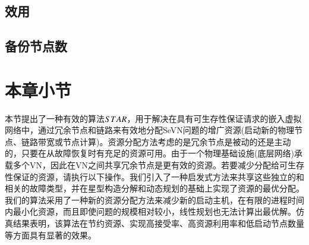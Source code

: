 \subsection{效用}
\subsection{备份节点数}
\section{本章小节}
本节提出了一种有效的算法$STAR$，用于解决在具有可生存性保证请求的嵌入虚拟网络中，通过冗余节点和链路来有效地分配SeVN问题的增广资源(启动新的物理节点、链路带宽或节点计算)。资源分配方法考虑的是冗余节点是被动的还是主动的，只要在从故障恢复时有充足的资源可用。由于一个物理基础设施(底层网络)承载多个VN，因此在VN之间共享冗余节点是更有效的资源。若要减少分配给可生存性保证的资源，请执行以下操作。我们引入了一种启发式方法来共享这些独立的和相关的故障类型，并在星型构造分解和动态规划的基础上实现了资源的最优分配。我们的算法采用了一种新的资源分配方法来减少新的启动主机，在有限的进程时间内最小化资源，而且即使问题的规模相对较小，线性规划也无法计算出最优解。仿真结果表明，该算法在节约资源、实现高接受率、高资源利用率和低启动节点数量等方面具有显著的效果。